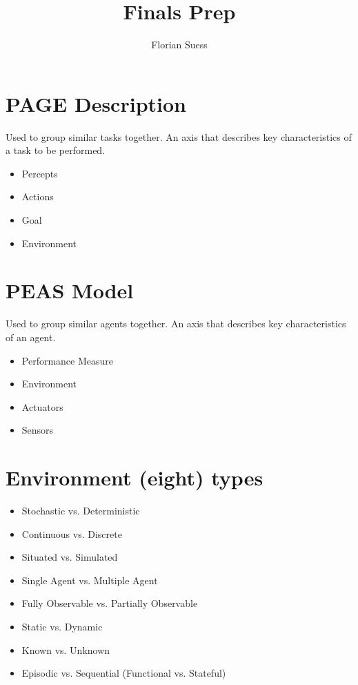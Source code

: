 \documentclass{article}
\begin{document}
\title{Finals Prep}
\date{}
\author{Florian Suess}
\maketitle

\section{PAGE Description}
Used to group similar tasks together. An axis that describes key characteristics of a task to be performed. 

\begin{itemize}
	\item Percepts
	\item Actions
	\item Goal
	\item Environment
\end{itemize}

\section{PEAS Model}
Used to group similar agents together. An axis that describes key characteristics of an agent.

\begin{itemize}
	\item Performance Measure
	\item Environment
	\item Actuators
	\item Sensors
\end{itemize}

\section{Environment (eight) types}
\begin{itemize}
	\item Stochastic vs. Deterministic
	\item Continuous vs. Discrete
	\item Situated vs. Simulated
	\item Single Agent vs. Multiple Agent
	\item Fully Observable vs. Partially Observable
	\item Static vs. Dynamic

	\item Known vs. Unknown
	\item Episodic vs. Sequential (Functional vs. Stateful)
\end{itemize}
\end{document}
